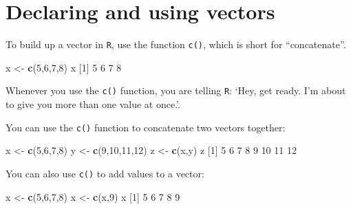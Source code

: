 \documentclass[]{book}
\newenvironment{Shaded}{\begin{snugshade}}{\end{snugshade}}
\newcommand{\DecValTok}[1]{\textcolor[rgb]{0.00,0.00,0.81}{#1}}
\newcommand{\KeywordTok}[1]{\textcolor[rgb]{0.13,0.29,0.53}{\textbf{#1}}}
\newcommand{\NormalTok}[1]{#1}
\newcommand{\StringTok}[1]{\textcolor[rgb]{0.31,0.60,0.02}{#1}}
\begin{document}
\hypertarget{declaring-and-using-vectors}{%
\section*{Declaring and using vectors}\label{declaring-and-using-vectors}}

To build up a vector in \texttt{R}, use the function \texttt{c()}, which is short for ``concatenate''.

\begin{Shaded}
\begin{Highlighting}[]
\NormalTok{x <-}\StringTok{ }\KeywordTok{c}\NormalTok{(}\DecValTok{5}\NormalTok{,}\DecValTok{6}\NormalTok{,}\DecValTok{7}\NormalTok{,}\DecValTok{8}\NormalTok{)}
\NormalTok{x}
\NormalTok{[}\DecValTok{1}\NormalTok{] }\DecValTok{5} \DecValTok{6} \DecValTok{7} \DecValTok{8}
\end{Highlighting}
\end{Shaded}

Whenever you use the \texttt{c()} function, you are telling \texttt{R}: `Hey, get ready. I'm about to give you more than one value at once.'.

You can use the \texttt{c()} function to concatenate two vectors together:

\begin{Shaded}
\begin{Highlighting}[]
\NormalTok{x <-}\StringTok{ }\KeywordTok{c}\NormalTok{(}\DecValTok{5}\NormalTok{,}\DecValTok{6}\NormalTok{,}\DecValTok{7}\NormalTok{,}\DecValTok{8}\NormalTok{)}
\NormalTok{y <-}\StringTok{ }\KeywordTok{c}\NormalTok{(}\DecValTok{9}\NormalTok{,}\DecValTok{10}\NormalTok{,}\DecValTok{11}\NormalTok{,}\DecValTok{12}\NormalTok{)}
\NormalTok{z <-}\StringTok{ }\KeywordTok{c}\NormalTok{(x,y)}
\NormalTok{z}
\NormalTok{[}\DecValTok{1}\NormalTok{]  }\DecValTok{5}  \DecValTok{6}  \DecValTok{7}  \DecValTok{8}  \DecValTok{9} \DecValTok{10} \DecValTok{11} \DecValTok{12}
\end{Highlighting}
\end{Shaded}

You can also use \texttt{c()} to add values to a vector:

\begin{Shaded}
\begin{Highlighting}[]
\NormalTok{x <-}\StringTok{ }\KeywordTok{c}\NormalTok{(}\DecValTok{5}\NormalTok{,}\DecValTok{6}\NormalTok{,}\DecValTok{7}\NormalTok{,}\DecValTok{8}\NormalTok{)}
\NormalTok{x <-}\StringTok{ }\KeywordTok{c}\NormalTok{(x,}\DecValTok{9}\NormalTok{)}
\NormalTok{x}
\NormalTok{[}\DecValTok{1}\NormalTok{] }\DecValTok{5} \DecValTok{6} \DecValTok{7} \DecValTok{8} \DecValTok{9}
\end{Highlighting}
\end{Shaded}
\end{document}
